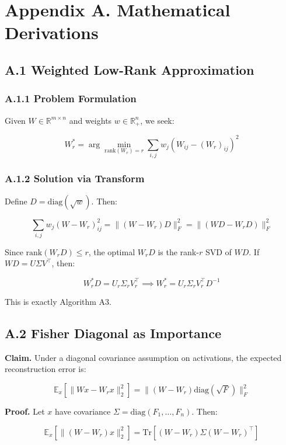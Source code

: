 
\section{Appendix A. Mathematical Derivations}

\subsection{A.1 Weighted Low-Rank Approximation}

\subsubsection{A.1.1 Problem Formulation}

Given $W \in \mathbb{R}^{m \times n}$ and weights $w \in \mathbb{R}_+^n$, 
we seek:

\[
W_r^* = \arg\min_{\text{rank}(W_r) = r} \sum_{i, j} w_j (W_{ij} - (W_r)_{ij})^2
\tag{A.1}
\]

\subsubsection{A.1.2 Solution via Transform}

Define $D = \mathrm{diag}(\sqrt{w})$. Then:

\[
\sum_{i, j} w_j (W - W_r)_{ij}^2 = \|(W - W_r) D\|_F^2 = \|(W D - W_r D)\|_F^2
\tag{A.2}
\]

Since $\text{rank}(W_r D) \leq r$, the optimal $W_r D$ is the rank-$r$ SVD 
of $W D$. If $W D = U \Sigma V^\top$, then:

\[
W_r^* D = U_r \Sigma_r V_r^\top \implies W_r^* = U_r \Sigma_r V_r^\top D^{-1}
\tag{A.3}
\]

This is exactly Algorithm A3.

\subsection{A.2 Fisher Diagonal as Importance}

\textbf{Claim.} Under a diagonal covariance assumption on activations, the 
expected reconstruction error is:

\[
\mathbb{E}_x\!\left[\|W x - W_r x\|_2^2\right] = \|(W - W_r) \mathrm{diag}(\sqrt{F})\|_F^2
\tag{A.4}
\]

\textbf{Proof.} Let $x$ have covariance $\Sigma = \mathrm{diag}(F_1, \dots, F_n)$. Then:

\[
\mathbb{E}_x[\|(W - W_r) x\|_2^2] = \mathrm{Tr}[(W - W_r) \Sigma (W - W_r)^\top]
\tag{A.5}
\]

